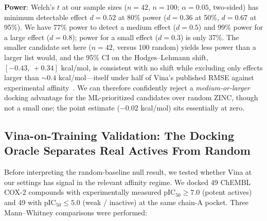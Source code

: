 \documentclass[11pt]{article}
\begin{document}
\textbf{Power}: Welch's $t$ at our sample sizes ($n = 42$, $n = 100$; $\alpha = 0.05$, two-sided) has minimum detectable effect $d = 0.52$ at 80\% power ($d = 0.36$ at 50\%, $d = 0.67$ at 95\%). We have 77\% power to detect a medium effect ($d = 0.5$) and 99\% power for a large effect ($d = 0.8$); power for a small effect ($d = 0.3$) is only 37\%. The smaller candidate set here ($n = 42$, versus 100 random) yields less power than a larger list would, and the 95\% CI on the Hodges--Lehmann shift, $[-0.43,\ +0.34]$ kcal/mol, is consistent with no shift while excluding only effects larger than $\sim 0.4$ kcal/mol---itself under half of Vina's published RMSE against experimental affinity~\cite{wang2016}. We can therefore confidently reject a \emph{medium-or-larger} docking advantage for the ML-prioritized candidates over random ZINC, though not a small one; the point estimate ($-0.02$ kcal/mol) sits essentially at zero.

\subsection{Vina-on-Training Validation: The Docking Oracle Separates Real Actives From Random}

Before interpreting the random-baseline null result, we tested whether Vina at our settings has signal in the relevant affinity regime. We docked 49 ChEMBL COX-2 compounds with experimentally measured pIC$_{50}\geq 7.0$ (potent actives) and 49 with pIC$_{50}\leq 5.0$ (weak / inactive) at the same chain-A pocket. Three Mann--Whitney comparisons were performed:

\begin{table}[H]
\centering
\small
\caption{Vina-on-training validation. Vina at \texttt{exhaustiveness}~$=8$ discriminates genuine ChEMBL COX-2 actives from random ZINC drug-likes ($p = 0.006$; actives dock $\sim 0.9$ kcal/mol more strongly). The weak/inactive ChEMBL set is also marginally separable from random ($p = 0.011$). The docking oracle has real signal in this pocket.}
\label{tab:vina_val}
\end{table}
\end{document}
